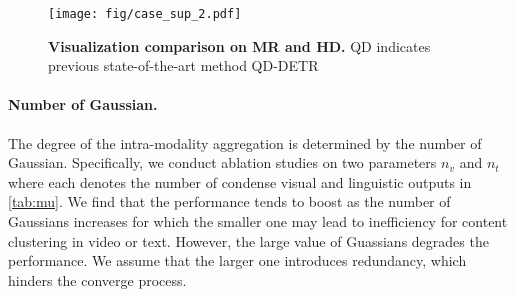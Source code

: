 \documentclass[10pt,twocolumn,letterpaper]{article}
\begin{document}
\begin{figure*}[ht]
\centering
    \texttt{[image: fig/case\_sup\_2.pdf]}
    \caption{\textbf{Visualization comparison on MR and HD.} QD indicates previous state-of-the-art method QD-DETR~\cite{qddetr}}
    \label{fig:sup_case_show_2}
\end{figure*}
\paragraph{Number of Gaussian.}
The degree of the intra-modality aggregation is determined by the number of Gaussian. Specifically, we conduct ablation studies on two parameters $n_v$ and $n_t$ where each denotes the number of condense visual and linguistic outputs in \cref{tab:mu}. We find that the performance tends to boost as the number of Gaussians increases for which the smaller one may lead to inefficiency for content clustering in video or text. However, the large value of Guassians degrades the performance. We assume that the larger one introduces redundancy, which hinders the converge process. 
\end{document}
